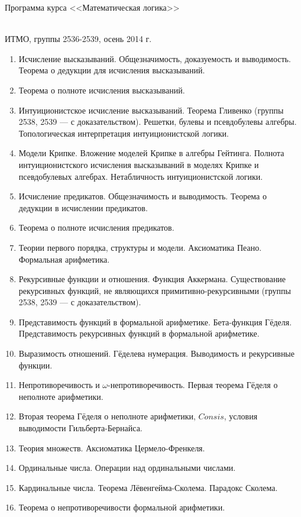 \documentclass[12pt,a4paper,oneside]{book}
\begin{document}
\begin{center}
\begin{Large}Программа курса <<Математическая логика>>\end{Large}\\
ИТМО, группы 2536-2539, осень 2014 г.
\end{center}

\begin{enumerate}
\item Исчисление высказываний. Общезначимость, доказуемость и выводимость. Теорема о дедукции для исчисления высказываний.
\item Теорема о полноте исчисления высказываний.
\item Интуиционистское исчисление высказываний. Теорема Гливенко (группы 2538, 2539 --- с доказательством). 
Решетки, булевы и псевдобулевы алгебры. Топологическая интерпретация интуиционистской логики.
\item Модели Крипке. Вложение моделей Крипке в алгебры Гейтинга. Полнота интуиционистского исчисления 
высказываний в моделях Крипке и псевдобулевых алгебрах. Нетабличность интуиционистской логики.
\item Исчисление предикатов. Общезначимость и выводимость. Теорема о дедукции в исчислении предикатов.
\item Теорема о полноте исчисления предикатов.
\item Теории первого порядка, структуры и модели. Аксиоматика Пеано. Формальная арифметика. 
\item Рекурсивные функции и отношения. Функция Аккермана. Существование рекурсивных функций,
не являющихся примитивно-рекурсивными (группы 2538, 2539 --- с доказательством). 
\item Представимость функций в формальной арифметике. Бета-функция Гёделя. 
Представимость рекурсивных функций в формальной арифметике.
\item Выразимость отношений. Гёделева нумерация. Выводимость и рекурсивные функции.
\item Непротиворечивость и $\omega$-непротиворечивость. Первая теорема Гёделя о неполноте арифметики.
\item Вторая теорема Гёделя о неполноте арифметики, $Consis$, условия выводимости Гильберта-Бернайса.
\item Теория множеств. Аксиоматика Цермело-Френкеля.
\item Ординальные числа. Операции над ординальными числами. 
\item Кардинальные числа. Теорема Лёвенгейма-Сколема. Парадокс Сколема.
\item Теорема о непротиворечивости формальной арифметики.
\end{enumerate}
\end{document}
